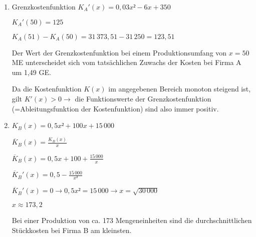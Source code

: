 \begin{langesbeispiel}
{\begin{enumerate}
	$K_B'(x)=x+100$
	
	$K_B''(x)=1>0$
	
	Da die zweite Ableitung positiv ist, ist die Funktion linksgekrümmt. Es liegt progressives Wachstum vor. 
	
	\textit{Andere richtige Begründungen (z.B. anhand des Graphen) sind auch zulässig.}
	
	$f(x)=ax²+bx+c$
	
	Wenn $a>0$ ist, ist der Graph der Kostenfunktion linksgekrümmt. Es liegt progressives Wachstum vor.
	
	Wenn $a<0$ ist, ist der Graph der Kostenfunktion rechtsgekrümmt. Es liegt degressives Wachstum vor.
	
	\item Grenzkostenfunktion $K_A'(x)=0,03x²-6x+350$
	
	$K_A'(50)=125$
	
	$K_A(51)-K_A(50)=31\,373,51-31\,250=123,51$
	
	Der Wert der Grenzkostenfunktion bei einem Produktionsumfang von $x=50$ ME unterscheidet sich vom tatsächlichen Zuwachs der Kosten bei Firma A um 1,49 GE.
	
	Da die Kostenfunktion $K(x)$ im angegebenen Bereich monoton steigend ist, gilt $K'(x)>0 \rightarrow$ die Funktionswerte der Grenzkostenfunktion (=Ableitungsfunktion der Kostenfunktion) sind also immer positiv.
	
	\item $K_B(x)=0,5x²+100x+15\,000$
	
	$\overline{K}_B(x)=\frac{K_B(x)}{x}$
	
	$\overline{K}_B(x)=0,5x+100+\frac{15\,000}{x}$
	
	$\overline{K}_B'(x)=0,5-\frac{15\,000}{x²}$
	
	$\overline{K}_B'(x)=0 \rightarrow 0,5x²=15\,000 \rightarrow x=\sqrt{30\,000}$
	
	$x\approx 173,2$
	
	Bei einer Produktion von ca. 173 Mengeneinheiten sind die durchschnittlichen Stückkosten bei Firma B am kleinsten.
\end{enumerate}}
\end{langesbeispiel}